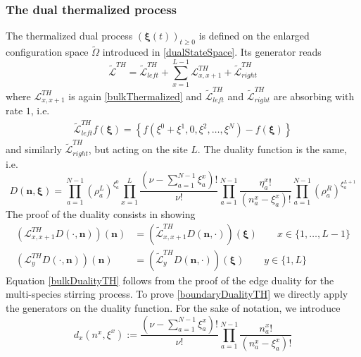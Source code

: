 \documentclass[10pt]{article}
\numberwithin{equation}{section}
\numberwithin{equation}{subsection}
\begin{document}
\subsubsection{The dual thermalized process}
The thermalized dual process $(\bm{\xi}(t))_{t\geq 0}$ is defined on the enlarged configuration space $\widetilde{\Omega}$ introduced in \eqref{dualStateSpace}. Its generator reads
\begin{equation}
		\widetilde{\mathcal{L}}^{TH}=\widetilde{\mathcal{L}}_{left}^{TH}+\sum_{x=1}^{L-1}\mathcal{L}_{x,x+1}^{TH}+\widetilde{\mathcal{L}}_{right}^{TH}
\end{equation}
where $\mathcal{L}^{TH}_{x,x+1}$ is again \eqref{bulkThermalized} and $\widetilde{\mathcal{L}}_{left}^{TH}$ and $\widetilde{\mathcal{L}}_{right}^{TH}$ are absorbing with rate $1$, i.e. 
\begin{equation}
	\begin{split}
		\widetilde{\mathcal{L}}_{left}^{TH}f(\bm{\xi})=\left\{f(\xi^{0}+\xi^{1},0,\xi^{2},\ldots,\xi^{N})-f(\bm{\xi})\right\}
	\end{split}
\end{equation}
and similarly $\widetilde{\mathcal{L}}_{right}^{TH}$, but acting on the site $L$. 
The duality function is the same, i.e.
\begin{equation}
	D(\bm{n},\bm{\xi})=\prod_{a=1}^{N-1}\left(\rho_{a}^{L}\right)^{\xi_{a}^{0}}\prod_{x=1}^{L}\frac{(\nu-\sum_{a=1}^{N-1}\xi_{a}^{x})!}{\nu!}\prod_{a=1}^{N-1}\frac{\eta_{a}^{x}!}{(n_{a}^{x}-\xi_{a}^{x})!}\prod_{a=1}^{N-1}\left(\rho_{a}^{R}\right)^{\xi_{a}^{L+1}}
\end{equation}
The proof of the duality consists in showing
\begin{align}
	\left(\mathcal{L}_{x,x+1}^{TH}D(\cdot,\bm{n})\right)(\bm{n})&=\left(\widetilde{\mathcal{L}}_{x,x+1}^{TH}D(\bm{n},\cdot)\right)(\bm{\xi})\qquad x\in \{1,\ldots,L-1\}\label{bulkDualityTH}\\
	\left(\mathcal{L}_{y}^{TH}D(\cdot,\bm{n})\right)(\bm{n})&=\left(\widetilde{\mathcal{L}}_{y}^{TH}D(\bm{n},\cdot)\right)(\bm{\xi})\qquad y\in\{1,L\}\label{boundaryDualityTH}
\end{align}
Equation \eqref{bulkDualityTH} follows from the proof of the edge duality for the multi-species stirring process. To prove \eqref{boundaryDualityTH} we directly apply the generators on the duality function. For the sake of notation, we introduce 
\begin{equation}
	d_{x}(n^{x},\xi^{x}):=\frac{(\nu-\sum_{a=1}^{N-1}\xi_{a}^{x})!}{\nu!}\prod_{a=1}^{N-1}\frac{n_{a}^{x}!}{(n_{a}^{x}-\xi_{a}^{x})!}
\end{equation}
\end{document}
